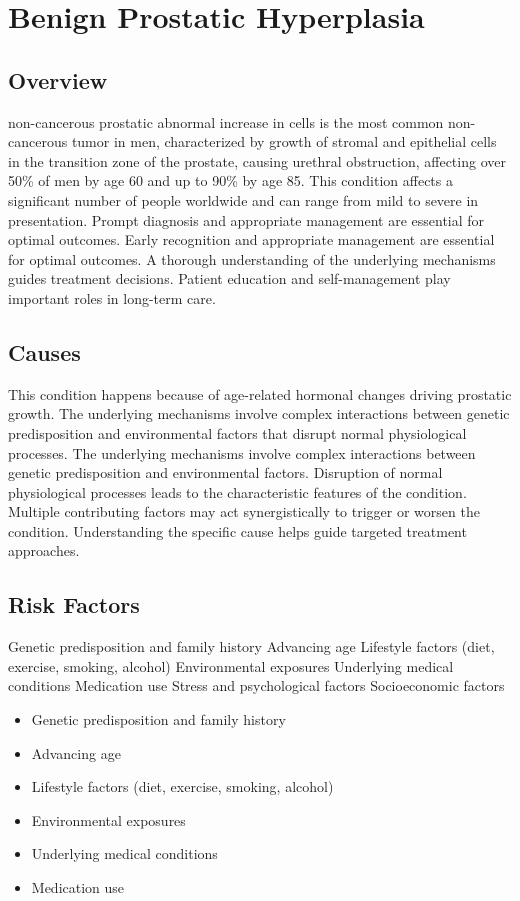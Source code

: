 \chapter{Benign Prostatic Hyperplasia}
\label{sec:Benign Prostatic Hyperplasia}

\section{Overview}
non-cancerous prostatic abnormal increase in cells is the most common non-cancerous tumor in men, characterized by growth of stromal and epithelial cells in the transition zone of the prostate, causing urethral obstruction, affecting over 50\% of men by age 60 and up to 90\% by age 85. This condition affects a significant number of people worldwide and can range from mild to severe in presentation. Prompt diagnosis and appropriate management are essential for optimal outcomes. Early recognition and appropriate management are essential for optimal outcomes. A thorough understanding of the underlying mechanisms guides treatment decisions. Patient education and self-management play important roles in long-term care.
\section{Causes}
This condition happens because of age-related hormonal changes driving prostatic growth. The underlying mechanisms involve complex interactions between genetic predisposition and environmental factors that disrupt normal physiological processes. The underlying mechanisms involve complex interactions between genetic predisposition and environmental factors. Disruption of normal physiological processes leads to the characteristic features of the condition. Multiple contributing factors may act synergistically to trigger or worsen the condition. Understanding the specific cause helps guide targeted treatment approaches.
\section{Risk Factors}
Genetic predisposition and family history Advancing age Lifestyle factors (diet, exercise, smoking, alcohol) Environmental exposures Underlying medical conditions Medication use Stress and psychological factors Socioeconomic factors

\begin{itemize}[noitemsep]
  \item Genetic predisposition and family history
  \item Advancing age
  \item Lifestyle factors (diet, exercise, smoking, alcohol)
  \item Environmental exposures
  \item Underlying medical conditions
  \item Medication use
\end{itemize}
